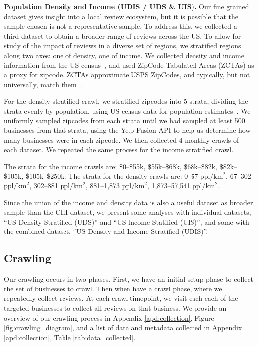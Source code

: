 \textbf{Population Density and Income (UDIS / UDS \& UIS).}
Our fine grained dataset gives insight into a local review ecosystem, but it is possible that the sample chosen is not a representative sample. To address this, we collected a third dataset to obtain a broader range of reviews across the US. To allow for study of the impact of reviews in a diverse set of regions, we stratified regions along two axes: one of density, one of income. 
We collected density and income information from the US census~\cite{acs2019householdincome}, and used ZipCode Tabulated Areas (ZCTAs) as a proxy for zipcode. ZCTAs approximate USPS ZipCodes, and typically, but not universally, match them~\cite{census2020zctas}.

For the density stratified crawl, we stratified zipcodes into 5 strata, dividing the strata evenly by population, using US census data for population estimates~\cite{acs2019populationtotal}. We uniformly sampled zipcodes from each strata until we had sampled at least 500 businesses from that strata, using the Yelp Fusion API to help us determine how many businesses were in each zipcode. We then collected 4 monthly crawls of each dataset. We repeated the same process for the income stratified crawl.

The strata for the income crawls are: \$0--\$55k, \$55k--\$68k, \$68k--\$82k, \$82k--\$105k, \$105k--\$250k. The strata for the density crawls are: 0--67 ppl/$\text{km}^2$, 67--302 ppl$/\text{km}^2$, 302--881 ppl$/\text{km}^2$, 881--1,873 ppl$/\text{km}^2$, 1,873--57,541 ppl$/\text{km}^2$.

Since the union of the income and density data is also a useful dataset as broader sample than the CHI dataset, we present some analyses with individual datasets, ``US Density Stratified (UDS)'' and ``US Income Statified (UIS)'', and some with the combined dataset, ``US Density and Income Stratified (UDIS)''.

\subsection{Crawling}\label{subsec:rim:crawling}


Our crawling occurs in two phases.
First, we have an initial setup phase to collect the set of businesses to crawl. 
Then when have a crawl phase, where we repeatedly collect reviews. At each crawl timepoint, we visit each each of the targeted businesses to collect all reviews on that business. We provide an overview of our crawling process in Appendix \ref{apd:collection}, Figure \ref{fig:crawling_diagram}, and a list of data and metadata collected in Appendix \ref{apd:collection}, Table \ref{tab:data_collected}. 

